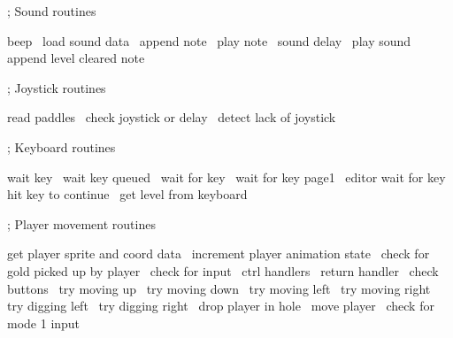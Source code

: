 \documentclass[10pt]{report}%
\begin{document}
    ; Sound routines

    \LA{}beep~{\nwtagstyle{}}\RA{}
    \LA{}load sound data~{\nwtagstyle{}}\RA{}
    \LA{}append note~{\nwtagstyle{}}\RA{}
    \LA{}play note~{\nwtagstyle{}}\RA{}
    \LA{}sound delay~{\nwtagstyle{}}\RA{}
    \LA{}play sound~{\nwtagstyle{}}\RA{}
    \LA{}append level cleared note~{\nwtagstyle{}}\RA{}

    ; Joystick routines

    \LA{}read paddles~{\nwtagstyle{}}\RA{}
    \LA{}check joystick or delay~{\nwtagstyle{}}\RA{}
    \LA{}detect lack of joystick~{\nwtagstyle{}}\RA{}

    ; Keyboard routines

    \LA{}wait key~{\nwtagstyle{}}\RA{}
    \LA{}wait key queued~{\nwtagstyle{}}\RA{}
    \LA{}wait for key~{\nwtagstyle{}}\RA{}
    \LA{}wait for key page1~{\nwtagstyle{}}\RA{}
    \LA{}editor wait for key~{\nwtagstyle{}}\RA{}
    \LA{}hit key to continue~{\nwtagstyle{}}\RA{}
    \LA{}get level from keyboard~{\nwtagstyle{}}\RA{}

    ; Player movement routines

    \LA{}get player sprite and coord data~{\nwtagstyle{}}\RA{}
    \LA{}increment player animation state~{\nwtagstyle{}}\RA{}
    \LA{}check for gold picked up by player~{\nwtagstyle{}}\RA{}
    \LA{}check for input~{\nwtagstyle{}}\RA{}
    \LA{}ctrl handlers~{\nwtagstyle{}}\RA{}
    \LA{}return handler~{\nwtagstyle{}}\RA{}
    \LA{}check buttons~{\nwtagstyle{}}\RA{}
    \LA{}try moving up~{\nwtagstyle{}}\RA{}
    \LA{}try moving down~{\nwtagstyle{}}\RA{}
    \LA{}try moving left~{\nwtagstyle{}}\RA{}
    \LA{}try moving right~{\nwtagstyle{}}\RA{}
    \LA{}try digging left~{\nwtagstyle{}}\RA{}
    \LA{}try digging right~{\nwtagstyle{}}\RA{}
    \LA{}drop player in hole~{\nwtagstyle{}}\RA{}
    \LA{}move player~{\nwtagstyle{}}\RA{}
    \LA{}check for mode 1 input~{\nwtagstyle{}}\RA{}
\end{document}
